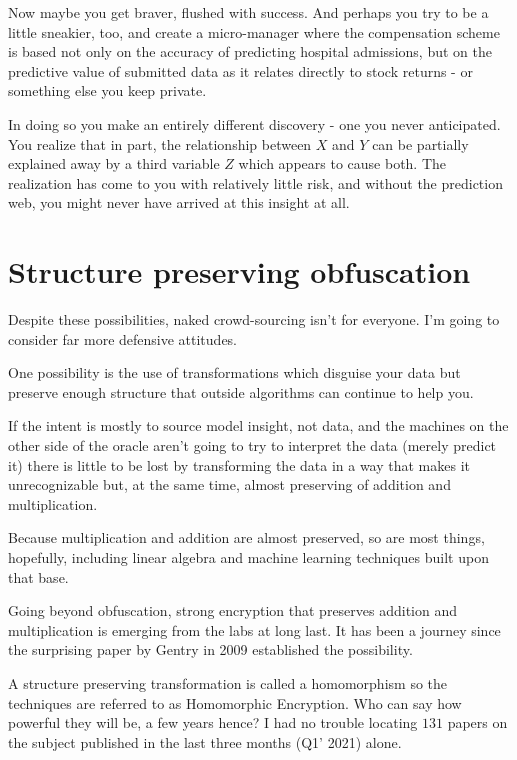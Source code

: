 Now maybe you get braver, flushed with success. And perhaps you try to be a little sneakier, too, and create a micro-manager where the compensation scheme is based not only on the accuracy of predicting hospital admissions, but on the predictive value of submitted data as it relates directly to stock returns - or something else you keep private. 


In doing so you make an entirely different discovery - one you never anticipated. You realize that in part, the relationship between $X$ and $Y$ can be partially explained away by a third variable $Z$ which appears to cause both. The realization has come to you with relatively little risk, and without the prediction web, you might never have arrived at this insight at all. 

\section{Structure preserving obfuscation}

Despite these possibilities, naked crowd-sourcing isn't for everyone. I'm going to consider far more defensive attitudes. 

One possibility is the use of transformations which disguise your data but preserve enough structure that outside algorithms can continue to help you. 

If the intent is mostly to source model insight, not data, and the machines on the other side of the oracle aren't going to try to interpret the data (merely predict it) there is little to be lost by transforming the data in a way that makes it unrecognizable but, at the same time, almost preserving of addition and multiplication. 

Because multiplication and addition are almost preserved, so are most things, hopefully, including linear algebra and machine learning techniques built upon that base.  

Going beyond obfuscation, strong encryption that preserves addition and multiplication is emerging from the labs at long last. It has been a journey since the surprising paper by Gentry in 2009 established the possibility. 

A structure preserving transformation is called a homomorphism so the techniques are referred to as Homomorphic Encryption. Who can say how powerful they will be, a few years hence? I had no trouble locating $131$ papers on the subject published in the last three  months (Q1' 2021) alone. 

